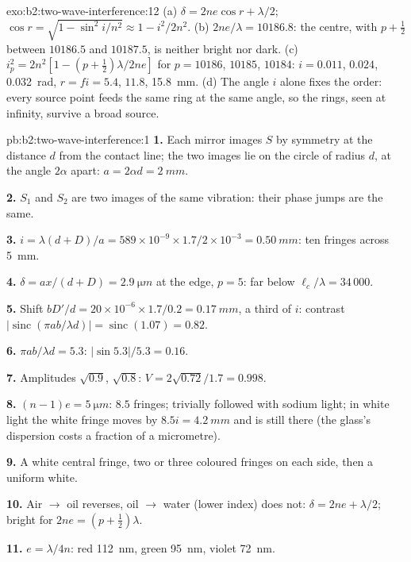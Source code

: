 \begin{solution}{exo:b2:two-wave-interference:12}
(a) $\delta = 2ne\cos r + \lambda/2$; $\cos r = \sqrt{1 - \sin^2i/n^2} \approx 1 - i^2/2n^2$.
(b) $2ne/\lambda = 10186.8$: the centre, with $p + \tfrac12$ between $10186.5$ and
$10187.5$, is neither bright nor dark. (c) $i_p^2 = 2n^2[1 - (p + \tfrac12)\lambda/
2ne]$ for $p = 10186$, $10185$, $10184$: $i = 0.011$, $0.024$, \qty{0.032}{rad}, $r = fi
= 5.4$, $11.8$, \qty{15.8}{mm}. (d) The angle $i$ alone fixes the order: every
source point feeds the same ring at the same angle, so the rings, seen
at infinity, survive a broad source.
\end{solution}

\begin{solution}{pb:b2:two-wave-interference:1}
\textbf{1.} Each mirror images $S$ by symmetry at the distance $d$ from
the contact line; the two images lie on the circle of radius $d$, at
the angle $2\alpha$ apart: $a = 2\alpha d = \qty{2}{mm}$.

\textbf{2.} $S_1$ and $S_2$ are two images of the same vibration: their
phase jumps are the same.

\textbf{3.} $i = \lambda(d + D)/a = 589 \times 10^{-9} \times 1.7/2 \times 10^{-3} = \qty{0.50}{mm}$: ten
fringes across \qty{5}{mm}.

\textbf{4.} $\delta = ax/(d + D) = \qty{2.9}{\micro m}$ at the edge, $p = 5$: far below
$\ell_c/\lambda = 34\,000$.

\textbf{5.} Shift $bD'/d = 20 \times 10^{-6} \times 1.7/0.2 = \qty{0.17}{mm}$, a third of
$i$: contrast $|\operatorname{sinc}(\pi ab/\lambda d)| = \operatorname{sinc}(1.07) = 0.82$.

\textbf{6.} $\pi ab/\lambda d = 5.3$: $|\sin5.3|/5.3 = 0.16$.

\textbf{7.} Amplitudes $\sqrt{0.9}$, $\sqrt{0.8}$: $V = 2\sqrt{0.72}/1.7 = 0.998$.

\textbf{8.} $(n - 1)e = \qty{5}{\micro m}$: $8.5$ fringes; trivially followed with
sodium light; in white light the white fringe moves by $8.5i = \qty{4.2}{mm}$
and is still there (the glass's dispersion costs a fraction of a
micrometre).

\textbf{9.} A white central fringe, two or three coloured fringes on
each side, then a uniform white.

\textbf{10.} Air $\to$ oil reverses, oil $\to$ water (lower index) does not:
$\delta = 2ne + \lambda/2$; bright for $2ne = (p + \tfrac12)\lambda$.

\textbf{11.} $e = \lambda/4n$: red \qty{112}{nm}, green \qty{95}{nm}, violet \qty{72}{nm}.


\end{solution}
